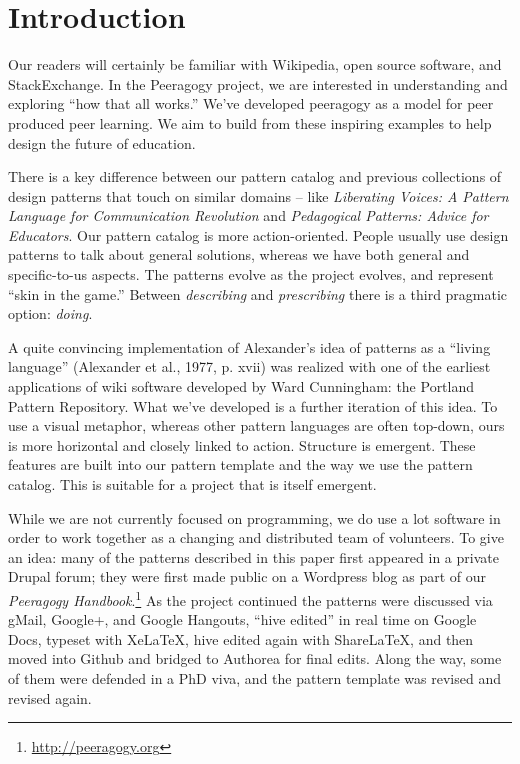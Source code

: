 \section{Introduction}

Our readers will certainly be familiar with Wikipedia, open source software, and StackExchange.  In the Peeragogy project, we are interested in understanding and exploring ``how that all works.''   We've developed peeragogy as a model for peer produced peer learning.  We aim to build from these inspiring examples to help design the future of education. 

There is a key difference between our pattern catalog and previous collections of design patterns that touch on similar domains -- like \emph{Liberating Voices: A Pattern Language for Communication Revolution} and \emph{Pedagogical Patterns: Advice for Educators}.  Our pattern catalog is more action-oriented.  People usually use design patterns to talk about general solutions, whereas we have both general and specific-to-us aspects. The patterns evolve as the project evolves, and represent ``skin in the game.''   Between \emph{describing} and \emph{prescribing} there is a third pragmatic option: \emph{doing}.  

A quite convincing implementation of Alexander’s idea of patterns as a “living language” (Alexander et
al., 1977, p. xvii) was realized with one of the earliest applications of wiki
software developed by Ward Cunningham: the Portland Pattern Repository.
What we've developed is a further iteration of this idea. To use a visual metaphor, whereas other pattern languages are often top-down, ours is more horizontal and closely linked to action.  Structure is emergent.  These features are built into our pattern template and the way we use the pattern catalog.  This is suitable for a project
that is itself emergent.

While we are not currently focused on programming, we do use a lot software in order to work together as a changing and distributed team of volunteers.  To give an idea: many of the patterns described in this paper first appeared in a private Drupal forum; they were first made public on a Wordpress blog as part of our \emph{Peeragogy Handbook}.\footnote{\url{http://peeragogy.org}}  As the project continued the patterns were discussed via gMail, Google+, and Google Hangouts, ``hive edited'' in real time on Google Docs, typeset with XeLaTeX, hive edited again with ShareLaTeX, and then moved into Github and bridged to Authorea for final edits. Along the way, some of them were defended in a PhD viva, and the pattern template was revised and revised again. 

